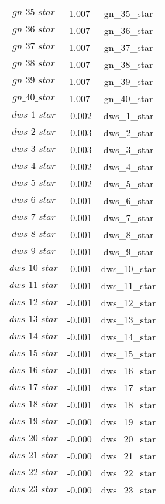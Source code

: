 \begin{center}
\begin{longtable}{ccc}
$gn\_35\_star$ 	 & 	 1.007 	 & 	 gn\_35\_star\\
$gn\_36\_star$ 	 & 	 1.007 	 & 	 gn\_36\_star\\
$gn\_37\_star$ 	 & 	 1.007 	 & 	 gn\_37\_star\\
$gn\_38\_star$ 	 & 	 1.007 	 & 	 gn\_38\_star\\
$gn\_39\_star$ 	 & 	 1.007 	 & 	 gn\_39\_star\\
$gn\_40\_star$ 	 & 	 1.007 	 & 	 gn\_40\_star\\
$dws\_1\_star$ 	 & 	 -0.002 	 & 	 dws\_1\_star\\
$dws\_2\_star$ 	 & 	 -0.003 	 & 	 dws\_2\_star\\
$dws\_3\_star$ 	 & 	 -0.003 	 & 	 dws\_3\_star\\
$dws\_4\_star$ 	 & 	 -0.002 	 & 	 dws\_4\_star\\
$dws\_5\_star$ 	 & 	 -0.002 	 & 	 dws\_5\_star\\
$dws\_6\_star$ 	 & 	 -0.001 	 & 	 dws\_6\_star\\
$dws\_7\_star$ 	 & 	 -0.001 	 & 	 dws\_7\_star\\
$dws\_8\_star$ 	 & 	 -0.001 	 & 	 dws\_8\_star\\
$dws\_9\_star$ 	 & 	 -0.001 	 & 	 dws\_9\_star\\
$dws\_10\_star$ 	 & 	 -0.001 	 & 	 dws\_10\_star\\
$dws\_11\_star$ 	 & 	 -0.001 	 & 	 dws\_11\_star\\
$dws\_12\_star$ 	 & 	 -0.001 	 & 	 dws\_12\_star\\
$dws\_13\_star$ 	 & 	 -0.001 	 & 	 dws\_13\_star\\
$dws\_14\_star$ 	 & 	 -0.001 	 & 	 dws\_14\_star\\
$dws\_15\_star$ 	 & 	 -0.001 	 & 	 dws\_15\_star\\
$dws\_16\_star$ 	 & 	 -0.001 	 & 	 dws\_16\_star\\
$dws\_17\_star$ 	 & 	 -0.001 	 & 	 dws\_17\_star\\
$dws\_18\_star$ 	 & 	 -0.001 	 & 	 dws\_18\_star\\
$dws\_19\_star$ 	 & 	 -0.000 	 & 	 dws\_19\_star\\
$dws\_20\_star$ 	 & 	 -0.000 	 & 	 dws\_20\_star\\
$dws\_21\_star$ 	 & 	 -0.000 	 & 	 dws\_21\_star\\
$dws\_22\_star$ 	 & 	 -0.000 	 & 	 dws\_22\_star\\
$dws\_23\_star$ 	 & 	 -0.000 	 & 	 dws\_23\_star\\

\end{longtable}
\end{center}

